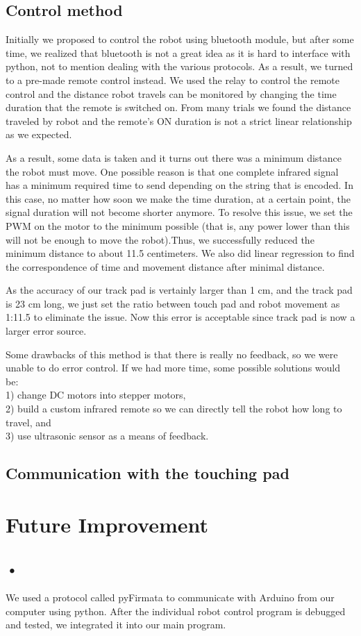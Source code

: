 \documentclass[reprint,amsmath, amsfonts, amssymb, aps, letterpaper]{revtex4-1}
\begin{document}
\subsection{Control method}
Initially we proposed to control the robot using bluetooth module, but after some time, we realized that bluetooth is not a great idea as it is hard to interface with python, not to mention dealing with the various protocols. As a result, we turned to a pre-made remote control instead. We used the relay to control the remote control and the distance robot travels can be monitored by changing the time duration that the remote is switched on. From many trials we found the distance traveled by robot and the remote's ON duration is not a strict linear relationship as we expected. 

As a result, some data is taken and it turns out there was a minimum distance the robot must move. One possible reason is that one complete infrared signal has a minimum required time to send depending on the string that is encoded. In this case, no matter how soon we make the time duration, at a certain point, the signal duration will not become shorter anymore. To resolve this issue, we set the PWM on the motor to the minimum possible (that is, any power lower than this will not be enough to move the robot).Thus, we successfully reduced the minimum distance to about 11.5 centimeters. We also did linear regression to find the correspondence of time and movement distance after minimal distance.

As the accuracy of our track pad is vertainly larger than 1 cm, and the track pad is 23 cm long, we just set the ratio between touch pad and robot movement as 1:11.5 to eliminate the issue. Now this error is acceptable since track pad is now a larger error source.

Some drawbacks of this method is that there is really no feedback, so we were unable to do error control. If we had more time, some possible solutions would be: \\
1) change DC motors into stepper motors, \\
2) build a custom infrared remote so we can directly tell the robot how long to travel, and \\
3) use ultrasonic sensor as a means of feedback.
\subsection{Communication with the touching pad}


\section{Future Improvement}
\subsection{•}

We used a protocol called pyFirmata to communicate with Arduino from our computer using python. After the individual robot control program is debugged and tested, we integrated it into our main program.


\nocite{*}
\end{document}
